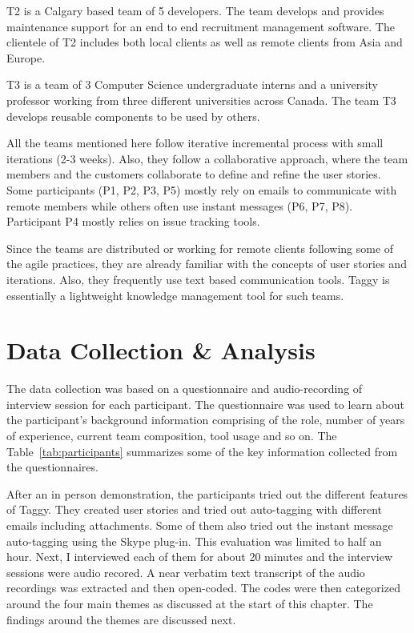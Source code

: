 T2 is a Calgary based team of 5 developers. The team develops and provides maintenance support for an end to end recruitment management software. The clientele of T2 includes both local clients as well as remote clients from Asia and Europe. 

T3 is a team of 3 Computer Science undergraduate interns and a university professor working from three different universities across Canada. The team T3 develops reusable components to be used by others.

All the teams mentioned here follow iterative incremental process with small iterations (2-3 weeks). Also, they follow a collaborative approach, where the team members and the customers collaborate to define and refine the user stories. Some participants (P1, P2, P3, P5) mostly rely on emails to communicate with remote members while others often use instant messages (P6, P7, P8). Participant P4 mostly relies on issue tracking tools.

Since the teams are distributed or working for remote clients following some of the agile practices, they are already familiar with the concepts of user stories and iterations. Also, they frequently use text based communication tools. Taggy is essentially a lightweight knowledge management tool for such teams.

\section{Data Collection \& Analysis}
The data collection was based on a questionnaire and audio-recording of interview session for each participant. The questionnaire was used to learn about the participant's background information comprising of the role, number of years of experience, current team composition, tool usage and so on. The Table~\ref{tab:participants} summarizes some of the key information collected from the questionnaires.

After an in person demonstration, the participants tried out the different features of Taggy. They created user stories and tried out auto-tagging with different emails including attachments. Some of them also tried out the instant message auto-tagging using the Skype plug-in. This evaluation was limited to half an hour. Next, I interviewed each of them for about 20 minutes and the interview sessions were audio recored. A near verbatim text transcript of the audio recordings was extracted and then open-coded\cite{open_coding}. The codes were then categorized around the four main themes as discussed at the start of this chapter. The findings around the themes are discussed next.


